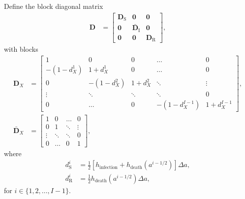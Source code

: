 \documentclass[12pt]{article}
\newcommand{\mat}[1]{\mathbf{#1}}
\begin{document}
Define the block diagonal matrix
\begin{align}
  \mat{D} &=
  \begin{bmatrix}
    \mat{D}_{\mathrm{S}} & \mat{0} & \mat{0}
    \\
    \mat{0} & \bar{\mat{D}}_{\mathrm{I}} & \mat{0}
    \\
    \mat{0} & \mat{0} & \mat{D}_{\mathrm{R}}
  \end{bmatrix},
\end{align}
with blocks
\begin{subequations}
  \begin{align}
    \mat{D}_X &=
    \begin{bmatrix}
      1 & 0 & 0 & \hdots & 0
      \\
      - (1 - d_X^1) & 1 + d_X^1 & 0 & \hdots & 0
      \\
      0 & - (1 - d_X^2) & 1 + d_X^2 & \ddots & \vdots
      \\
      \vdots & \ddots & \ddots & \ddots & 0
      \\
      0 & \hdots & 0 & - (1 - d_X^{I - 1}) & 1 + d_X^{I - 1}
    \end{bmatrix},
    \\
    \bar{\mat{D}}_X &=
    \begin{bmatrix}
      1 & 0 & \hdots & 0 \\
      0 & 1 & \ddots & \vdots \\
      \vdots & \ddots & \ddots & 0 \\
      0 & \hdots & 0 & 1
    \end{bmatrix},
  \end{align}
\end{subequations}
where
\begin{subequations}
  \begin{align}
    d_{\mathrm{S}}^i
    &= \frac{1}{2} \left[h_{\text{infection}}
      + h_{\text{death}}(a^{i - 1 / 2})\right]
      \Delta a,
    \\
    d_{\mathrm{R}}^i
    &= \frac{1}{2} h_{\text{death}}(a^{i - 1 / 2}) \Delta a,
  \end{align}
\end{subequations}
for $i \in \{1, 2, \ldots, I - 1\}$.
\end{document}
